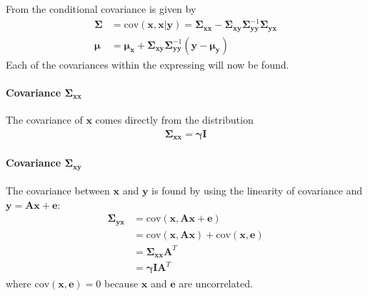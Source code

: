 From \cite{conditional_cov} the conditional covariance is given by
\begin{align*}
\boldsymbol{\Sigma} &= \text{cov}(\mathbf{x} , \mathbf{x} \vert \mathbf{y}) = \boldsymbol{\Sigma}_{\mathbf{xx}} - \boldsymbol{\Sigma}_{\mathbf{xy}} \boldsymbol{\Sigma}_{\mathbf{yy}}^{-1} \boldsymbol{\Sigma}_{\mathbf{yx}} \\
\boldsymbol{\mu} &= \boldsymbol{\mu}_{\mathbf{x}} + \boldsymbol{\Sigma}_{\mathbf{xy}} \boldsymbol{\Sigma}_{\mathbf{yy}}^{-1} (\mathbf{y} - \boldsymbol{\mu}_{\mathbf{y}})
\end{align*}
Each of the covariances within the expressing will now be found.

\paragraph{Covariance $\boldsymbol{\Sigma}_{\mathbf{xx}}$}
The covariance of $\mathbf{x}$ comes directly from the distribution  
\begin{align*}
\boldsymbol{\Sigma}_{\mathbf{xx}} = \boldsymbol{\gamma} \mathbf{I}
\end{align*} 

\paragraph{Covariance $\boldsymbol{\Sigma}_{\mathbf{xy}}$}
The covariance between $\mathbf{x}$ and $\mathbf{y}$ is found by using the linearity of covariance and $\mathbf{y} = \mathbf{Ax} + \mathbf{e}$:
\begin{align*}
\boldsymbol{\Sigma}_{\mathbf{yx}} &= \text{cov} \left(\mathbf{x} , \mathbf{Ax} + \mathbf{e} \right) \\ 
&= \text{cov} \left(\mathbf{x} , \mathbf{Ax} \right) + \text{cov} \left(\mathbf{x} , \mathbf{e} \right) \\
&= \boldsymbol{\Sigma}_{\mathbf{xx}} \mathbf{A}^T \\
&= \boldsymbol{\gamma} \mathbf{I} \mathbf{A}^T
\end{align*}
where $\text{cov} \left(\mathbf{x} , \mathbf{e} \right) = 0$ because $\textbf{x}$ and $\textbf{e}$ are uncorrelated.

